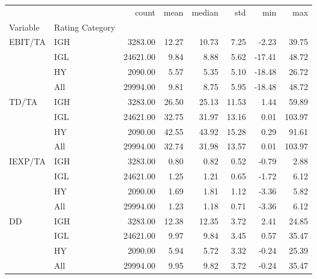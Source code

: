 \begin{tabular}{llrrrrrr}
\toprule
 &  & count & mean & median & std & min & max \\
Variable & Rating Category &  &  &  &  &  &  \\
\midrule
\multirow[t]{4}{*}{EBIT/TA} & IGH & 3283.00 & 12.27 & 10.73 & 7.25 & -2.23 & 39.75 \\
 & IGL & 24621.00 & 9.84 & 8.88 & 5.62 & -17.41 & 48.72 \\
 & HY & 2090.00 & 5.57 & 5.35 & 5.10 & -18.48 & 26.72 \\
 & All & 29994.00 & 9.81 & 8.75 & 5.95 & -18.48 & 48.72 \\
\cline{1-8}
\multirow[t]{4}{*}{TD/TA} & IGH & 3283.00 & 26.50 & 25.13 & 11.53 & 1.44 & 59.89 \\
 & IGL & 24621.00 & 32.75 & 31.97 & 13.16 & 0.01 & 103.97 \\
 & HY & 2090.00 & 42.55 & 43.92 & 15.28 & 0.29 & 91.61 \\
 & All & 29994.00 & 32.74 & 31.98 & 13.57 & 0.01 & 103.97 \\
\cline{1-8}
\multirow[t]{4}{*}{IEXP/TA} & IGH & 3283.00 & 0.80 & 0.82 & 0.52 & -0.79 & 2.88 \\
 & IGL & 24621.00 & 1.25 & 1.21 & 0.65 & -1.72 & 6.12 \\
 & HY & 2090.00 & 1.69 & 1.81 & 1.12 & -3.36 & 5.82 \\
 & All & 29994.00 & 1.23 & 1.18 & 0.71 & -3.36 & 6.12 \\
\cline{1-8}
\multirow[t]{4}{*}{DD} & IGH & 3283.00 & 12.38 & 12.35 & 3.72 & 2.41 & 24.85 \\
 & IGL & 24621.00 & 9.97 & 9.84 & 3.45 & 0.57 & 35.47 \\
 & HY & 2090.00 & 5.94 & 5.72 & 3.32 & -0.24 & 25.39 \\
 & All & 29994.00 & 9.95 & 9.82 & 3.72 & -0.24 & 35.47 \\
\cline{1-8}
\bottomrule
\end{tabular}
